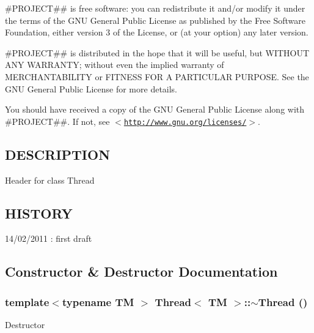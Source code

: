 \#PROJECT\#\# is free software: you can redistribute it and/or modify it under the terms of the GNU General Public License as published by the Free Software Foundation, either version 3 of the License, or (at your option) any later version.

\#PROJECT\#\# is distributed in the hope that it will be useful, but WITHOUT ANY WARRANTY; without even the implied warranty of MERCHANTABILITY or FITNESS FOR A PARTICULAR PURPOSE. See the GNU General Public License for more details.

You should have received a copy of the GNU General Public License along with \#PROJECT\#\#. If not, see $<$\href{http://www.gnu.org/licenses/}{\tt http://www.gnu.org/licenses/}$>$.\hypertarget{d6/d40/classThread_3_01TM_01_4_DESCRIPTION}{}\subsection{DESCRIPTION}\label{d6/d40/classThread_3_01TM_01_4_DESCRIPTION}
Header for class Thread\hypertarget{d6/d40/classThread_3_01TM_01_4_HISTORY}{}\subsection{HISTORY}\label{d6/d40/classThread_3_01TM_01_4_HISTORY}
14/02/2011 : first draft 

\subsection{Constructor \& Destructor Documentation}
\hypertarget{classThread_3_01TM_01_4_a7be785d060b3f0eac64a96befb552db5}{
\subsubsection[{$\sim$Thread}]{\setlength{\rightskip}{0pt plus 5cm}template$<$typename TM $>$ Thread$<$ TM $>$::$\sim$Thread ()}}
\label{d6/d40/classThread_3_01TM_01_4_a7be785d060b3f0eac64a96befb552db5}
Destructor 


